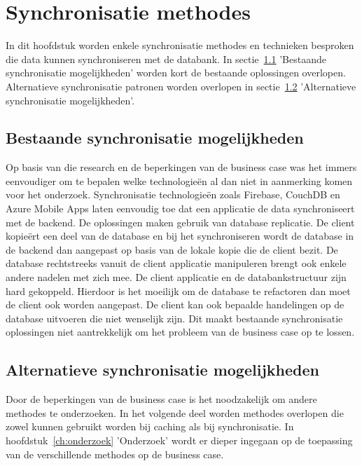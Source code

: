 
\chapter{Synchronisatie methodes}
\label{ch:synchronisatiemethdodes}


In dit hoofdstuk worden enkele synchronisatie methodes en technieken besproken die data kunnen synchroniseren met de databank. In sectie~\ref{sec:bestaande} 'Bestaande synchronisatie mogelijkheden' worden kort de bestaande oplossingen overlopen. Alternatieve synchronisatie patronen worden overlopen in sectie~\ref{sec:alternatieven} 'Alternatieve synchronisatie mogelijkheden'.

\section{Bestaande synchronisatie mogelijkheden}
\label{sec:bestaande}
Op basis van die research en de beperkingen van de business case was het immers eenvoudiger om te bepalen welke technologie\"en al dan niet in aanmerking komen voor het onderzoek. Synchronisatie technologie\"en zoals Firebase\autocite{firebase-sync}, CouchDB\autocite{sync-couchdb} en Azure Mobile Apps\autocite{azure-sync} laten eenvoudig toe dat een applicatie de data synchroniseert met de backend. De oplossingen maken gebruik van database replicatie. De client kopie\"ert een deel van de database en bij het synchroniseren wordt de database in de backend dan aangepast op basis van de lokale kopie die de client bezit. De database rechtstreeks vanuit de client applicatie manipuleren brengt ook enkele andere nadelen met zich mee. De client applicatie en de databankstructuur zijn hard gekoppeld. Hierdoor is het moeilijk om de database te refactoren dan moet de client ook worden aangepast. De client kan ook bepaalde handelingen op de database uitvoeren die niet wenselijk zijn. Dit maakt bestaande synchronisatie oplossingen niet aantrekkelijk om het probleem van de business case op te lossen.

\section{Alternatieve synchronisatie mogelijkheden}
\label{sec:alternatieven}
Door de beperkingen van de business case is het noodzakelijk om andere methodes te onderzoeken. In het volgende deel worden methodes\autocite{outsystem-sync} overlopen die zowel kunnen gebruikt worden bij caching als bij synchronisatie. In hoofdstuk~\ref{ch:onderzoek} 'Onderzoek' wordt er dieper ingegaan op de toepassing van de verschillende methodes op de business case.

